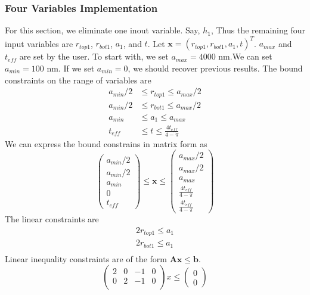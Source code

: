 \documentclass[12pt]{article}
\numberwithin{equation}{section}
\numberwithin{equation}{section}
\begin{document}
\subsubsection{Four Variables Implementation}
For this section, we eliminate one inout variable. Say, $h_1$, Thus the remaining four input variables are $r_{top1}$, $r_{bot1}$, $a_1$, and $t$.  Let $\mathbf{x} = \left ( r_{top1}, r_{bot1}, a_1, t  \right )^T $. $a_{max}$ and $t_{eff}$ are set by the user.  To start with, we set $a_{max} = 4000$ nm.We can set $a_{min} = 100$ nm.  If we set $a_{min} = 0$, we should recover previous results. The bound constraints on the range of variables are
\begin{align*}
a_{min}/2 & \leq r_{top1} \leq a_{max}/2 \\
a_{min}/2 & \leq r_{bot1} \leq a_{max}/2 \\
a_{min} & \leq a_{1} \leq a_{max} \\
t_{eff}  & \leq t \leq \frac {4t_{eff}}{4-\pi}
\end{align*}
We can express the bound constrains in matrix form as
\begin{equation}
\left(
\begin{matrix}
a_{min}/2\\ 
a_{min}/2\\
a_{min}\\ 
0 \\
t_{eff} 
\end{matrix} \right )
\leq \mathbf{x}
 \leq 
 \left(
\begin{matrix}
a_{max}/2 \\ a_{max}/2 \\ a_{max}  \\ \frac {4t_{eff}}{4-\pi}\\ \frac {4t_{eff}}{4-\pi}
\end{matrix} \right )
\end{equation}
The linear constraints are 
\begin{align*}   
2r_{top1} \leq a_1 \\
2r_{bot1} \leq a_1 \\
\end{align*}
Linear inequality constraints are of the form $\mathbf{A} \mathbf{x} \leq \mathbf{b}$.
\begin{equation}
\left(
\begin{matrix}
2 & 0 & -1 & 0  \\
0 & 2 & -1 & 0  \\
\end{matrix}
\right ) x  \leq \left ( \begin{matrix} 0\\ 0 \end{matrix} \right ) 
\end{equation}
\end{document}
